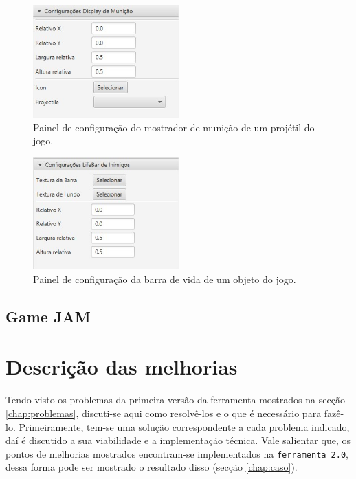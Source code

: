 \documentclass[12pt,twoside,openright,a4paper,english,brazil,sumario=tradicional]{abntex2}
\begin{document}
\begin{figure}[h]
\centering
\includegraphics[width=0.5\textwidth]{images/configurar-municao-1.jpg}
\caption{Painel de configuração do mostrador de munição de um projétil do jogo.}
\label{fig:configurar-municao-1}
\end{figure}
\begin{figure}[h]
\centering
\includegraphics[width=0.5\textwidth]{images/configurar-vida-1.jpg}
\caption{Painel de configuração da barra de vida de um objeto do jogo.}
\label{fig:configurar-vida-1}
\end{figure}

\section{Game JAM} %

\chapter{Descrição das melhorias} %
\label{chap:melhorias}
Tendo visto os problemas da primeira versão da ferramenta mostrados na secção \ref{chap:problemas}, discuti-se aqui como resolvê-los e o que é necessário para fazê-lo. Primeiramente, tem-se uma solução correspondente a cada problema indicado, daí é discutido a sua viabilidade e a implementação técnica. Vale salientar que, os pontos de melhorias mostrados encontram-se implementados na \texttt{ferramenta 2.0}, dessa forma pode ser mostrado o resultado disso (secção \ref{chap:caso}).
\end{document}
